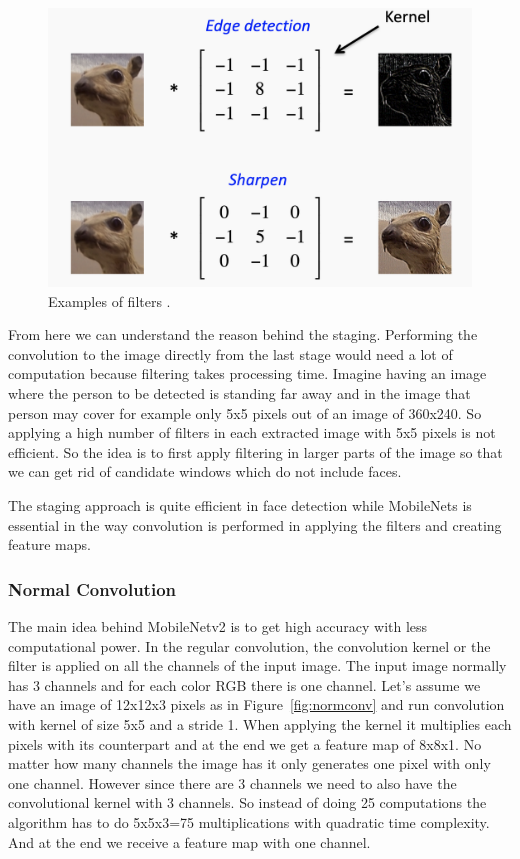 \begin{figure}[!htb]
    \centering
    \includegraphics[width=1\textwidth]{figures/filters.png}
    \caption{Examples of filters \cite{simpleconvolution}.}
    \label{fig:filter}
\end{figure}
From here we can understand the reason behind the staging. Performing the convolution to the image directly from the last stage would need a lot of computation because filtering takes processing time. Imagine having an image where the person to be detected is standing far away and in the image that person may cover for example only 5x5 pixels out of an image of 360x240. So applying a high number of filters in each extracted image with 5x5 pixels is not efficient. So the idea is to first apply filtering in larger parts of the image so that we can get rid of candidate windows which do not include faces.

The staging approach is quite efficient in face detection while MobileNets is essential in the way convolution is performed in applying the filters and creating feature maps. 



\subsubsection{Normal Convolution}

The main idea behind MobileNetv2 is to get high accuracy with less computational power. In the regular convolution, the convolution kernel or the filter is applied on all the channels of the input image. The input image normally has 3 channels and for each color RGB there is one channel. Let's assume we have an image of 12x12x3 pixels as in Figure~\ref{fig:normconv} and run convolution with kernel of size 5x5 and a stride 1. When applying the kernel it multiplies each pixels with its counterpart and at the end we get a feature map of 8x8x1. No matter how many channels the image has it only generates one pixel with only one channel.
However since there are 3 channels we need to also have the convolutional kernel with 3 channels. So instead of doing 25 computations the algorithm has to do 5x5x3=75 multiplications with quadratic time complexity. And at the end we receive a feature map with one channel. 

